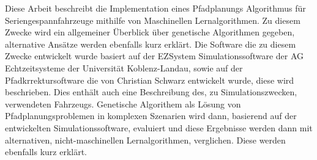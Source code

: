 \abstractDE 

Diese Arbeit beschreibt die Implementation eines Pfadplanungs Algorithmus für Seriengespannfahrzeuge mithilfe von Maschinellen Lernalgorithmen. Zu diesem Zwecke wird ein allgemeiner Überblick über genetische Algorithmen gegeben, alternative Ansätze werden ebenfalls kurz erklärt. Die Software die zu diesem Zwecke entwickelt wurde basiert auf der EZSystem Simulationssoftware der AG Echtzeitsysteme der Universität Koblenz-Landau, sowie auf der Pfadkrrektursoftware die von Christian Schwarz entwickelt wurde, diese wird beschrieben. Dies enthält auch eine Beschreibung des, zu Simulationszwecken, verwendeten Fahrzeugs. Genetische Algorithem als Lösung von Pfadplanungsproblemen in komplexen Szenarien wird dann, basierend auf der entwickelten Simulationssoftware, evaluiert und diese Ergebnisse werden dann mit alternativen, nicht-maschinellen Lernalgorithmen, verglichen. Diese werden ebenfalls kurz erklärt.

